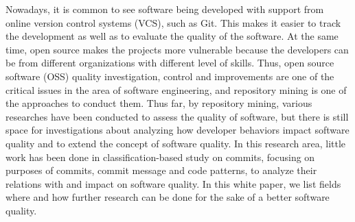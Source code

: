 Nowadays, it is common to see software being developed with support from online version control systems (VCS), such as Git. This makes it easier to track the development as well as to evaluate the quality of the software.
At the same time, open source makes the projects more vulnerable \cite{} because the developers can be from different organizations with different level of skills.
Thus, open source software (OSS) quality investigation, control and improvements are one of the critical issues in the area of software engineering, and repository mining is one of the approaches to conduct them.
Thus far, by repository mining, various researches have been conducted to assess the quality of software, but there is still space for investigations about analyzing how developer behaviors impact software quality and to extend the concept of software quality.
In this research area, little work has been done in classification-based study on commits, focusing on purposes of commits, commit message and code patterns, to analyze their relations with and impact on software quality.
In this white paper, we list fields where and how further research can be done for the sake of a better software quality. 
